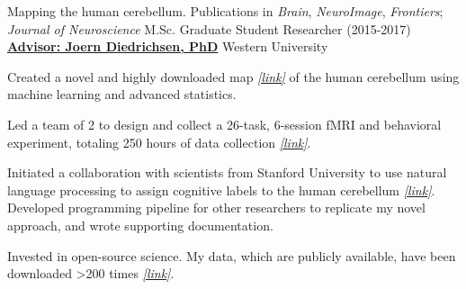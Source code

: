 \begin{cventries}
  \cventry
    {Mapping the human cerebellum. Publications in \textit{Brain}, \textit{NeuroImage}, \textit{Frontiers}; \textit{Journal of Neuroscience}}
    {M.Sc. Graduate Student Researcher (2015-2017)} %
    {\href{https://github.com/maedbhk/}{\textbf{Advisor: Joern Diedrichsen, PhD}}}
    {Western University} %
    {
      \begin{cvitems} %
        \item {Created a novel and highly downloaded map {\href{http://www.diedrichsenlab.org/imaging/mdtb.htm}{\textit{[link]}}} of the human cerebellum using machine learning and advanced statistics.}
      	\item {Led a team of 2 to design and collect a 26-task, 6-session fMRI and behavioral experiment, totaling 250 hours of data collection {\href{http://www.diedrichsenlab.org/imaging/AtlasViewer/viewer.html}{\textit{[link]}}}.}
      	\item {Initiated a collaboration with scientists from Stanford University to use natural language processing to assign cognitive labels to the human cerebellum {\href{https://cognitiveatlas.org/}{\textit{[link]}}}. Developed programming pipeline for other researchers to replicate my novel approach, and wrote supporting documentation.}
      	\item {Invested in open-source science. My data, which are publicly available, have been downloaded >200 times {\href{https://openneuro.org/datasets/ds002105/versions/1.1.0}{\textit{[link]}}}.}
      \end{cvitems}
    }

\end{cventries}
